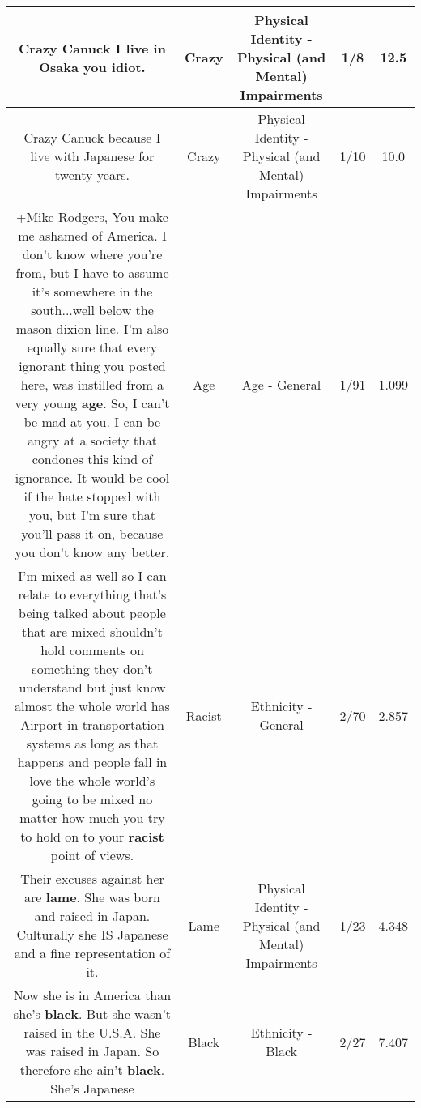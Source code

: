 \documentclass[11pt]{article}
\newlength\mylength
\begin{document}
\begin{center}
\begin{longtable}{|C{.65\mylength}|C{.30\mylength}|C{.12\mylength}|C{.12\mylength}|C{.12\mylength}|}
  \small Crazy Canuck I live in Osaka you idiot.\normalsize   & Crazy & Physical Identity - Physical (and Mental) Impairments & 1/8 & 12.5 \\  \hline
  \small Crazy Canuck because I live with Japanese for twenty years.\normalsize   & Crazy & Physical Identity - Physical (and Mental) Impairments & 1/10 & 10.0 \\  \hline
  \small +Mike Rodgers, You make me ashamed of America. I don't know where you're from, but I have to assume it's somewhere in the south...well below the mason dixion line. I'm also equally sure that every ignorant thing you posted here, was instilled from a very young \textbf{age}. So, I can't be mad at you. I can be angry at a society that condones this kind of ignorance. It would be cool if the hate stopped with you, but I'm sure that you'll pass it on, because you don't know any better.\normalsize   & Age & Age - General & 1/91 & 1.099 \\  \hline
  \small I'm mixed as well so I can relate to everything that's being talked about people that are mixed shouldn't hold comments on something they don't understand but just know almost the whole world has Airport in transportation systems as long as that happens and people fall in love the whole world's going to be mixed no matter how much you try to hold on to your \textbf{racist} point of views.\normalsize   & Racist & Ethnicity - General & 2/70 & 2.857 \\  \hline
  \small Their excuses against her are \textbf{lame}. She was born and raised in Japan. Culturally she IS Japanese and a fine representation of it.\normalsize   & Lame & Physical Identity - Physical (and Mental) Impairments & 1/23 & 4.348 \\  \hline
  \small Now she is in America than she's \textbf{black}. But she wasn't raised in the U.S.A. She was raised in Japan. So therefore she ain't \textbf{black}. She's Japanese\normalsize   & Black & Ethnicity - Black & 2/27 & 7.407 \\  \hline

\end{longtable}
\end{center}
\end{document}
